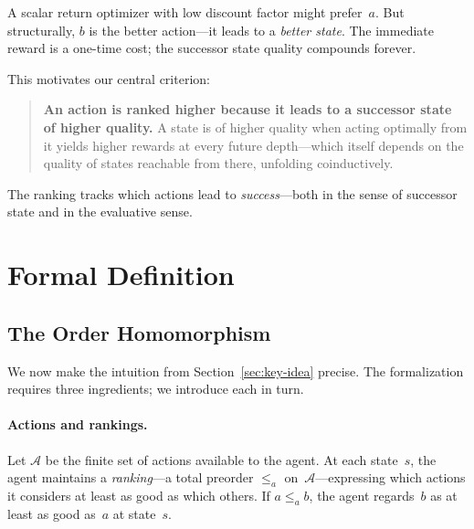 \documentclass[runningheads]{llncs}
\begin{document}
A scalar return optimizer with low discount factor might prefer~$a$.  But structurally, $b$ is the better action---it leads to a \emph{better state}.  The immediate reward is a one-time cost; the successor state quality compounds forever.

This motivates our central criterion:

\begin{quote}
\textbf{An action is ranked higher because it leads to a successor state of higher quality.}  A state is of higher quality when acting optimally from it yields higher rewards at every future depth---which itself depends on the quality of states reachable from there, unfolding coinductively.
\end{quote}

The ranking tracks which actions lead to \emph{success}---both in the sense of successor state and in the evaluative sense.


\section{Formal Definition}\label{sec:formal}

\subsection{The Order Homomorphism}

We now make the intuition from Section~\ref{sec:key-idea} precise.  The formalization requires three ingredients; we introduce each in turn.

\paragraph{Actions and rankings.}
Let $\mathcal{A}$ be the finite set of actions available to the agent.
At each state~$s$, the agent maintains a \emph{ranking}---a total preorder $\le_a$ on~$\mathcal{A}$---expressing which actions it considers at least as good as which others.
If $a \le_a b$, the agent regards~$b$ as at least as good as~$a$ at state~$s$.
\end{document}
